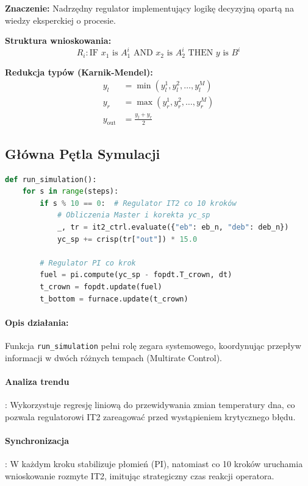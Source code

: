 \documentclass[12pt,a4paper]{article}
\begin{document}
\textbf{Znaczenie:} Nadrzędny regulator implementujący logikę decyzyjną opartą na wiedzy eksperckiej o procesie.

\textbf{Struktura wnioskowania:}
\begin{equation}
    R_i: \text{IF } x_1 \text{ is } A_1^i \text{ AND } x_2 \text{ is } A_2^i \text{ THEN } y \text{ is } B^i
\end{equation}

\textbf{Redukcja typów (Karnik-Mendel):}
\begin{align}
    y_l &= \min(y_l^1, y_l^2, \ldots, y_l^M) \\
    y_r &= \max(y_r^1, y_r^2, \ldots, y_r^M) \\
    y_{\text{out}} &= \frac{y_l + y_r}{2}
\end{align}

\subsection{Główna Pętla Symulacji}

\begin{lstlisting}[language=Python, caption={Pętla sterowania}]
def run_simulation():
    for s in range(steps):
        if s % 10 == 0:  # Regulator IT2 co 10 kroków
            # Obliczenia Master i korekta yc_sp
            _, tr = it2_ctrl.evaluate({"eb": eb_n, "deb": deb_n})
            yc_sp += crisp(tr["out"]) * 15.0
            
        # Regulator PI co krok
        fuel = pi.compute(yc_sp - fopdt.T_crown, dt)
        t_crown = fopdt.update(fuel)
        t_bottom = furnace.update(t_crown)
\end{lstlisting}

\paragraph{Opis działania:} 
Funkcja \texttt{run\_simulation} pełni rolę zegara systemowego, koordynując przepływ informacji w dwóch różnych tempach (Multirate Control).


  \paragraph{Analiza trendu}: Wykorzystuje regresję liniową do przewidywania zmian temperatury dna, co pozwala regulatorowi IT2 zareagować przed wystąpieniem krytycznego błędu.
 \paragraph{Synchronizacja}: W każdym kroku stabilizuje płomień (PI), natomiast co 10 kroków uruchamia wnioskowanie rozmyte IT2, imitując strategiczny czas reakcji operatora.
\end{document}
